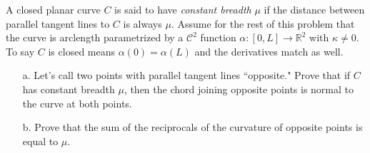 \documentclass[Shifrin_Solutions_Spring_2018]{subfiles}
\begin{document}
\vspace{.5in}

\begin{exercise}
A closed planar curve $C$ is said to have \emph{constant breadth} $\mu$ if the distance 
between parallel tangent lines to $C$ is always $\mu$. Assume for the rest of this problem 
that the curve is arclength parametrized by a $\mathcal{C}^2$ function 
$\alpha:[0,L]\rightarrow \mathbb{R}^2$ with $\kappa\neq 0$. To say $C$ is closed means 
$\alpha(0) = \alpha(L)$ and the derivatives match as well.
\begin{itemize}
\item[a.] Let's call two points with parallel tangent lines ``opposite." Prove that if $C$ 
has constant breadth $\mu$, then the chord joining opposite points is normal to the curve 
at both points.
\item[b.] Prove that the sum of the reciprocals of the curvature of opposite points is 
equal to $\mu$.
\end{itemize}
\end{exercise}
\end{document}
